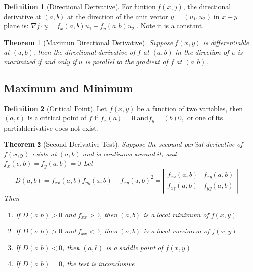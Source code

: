\documentclass[9pt]{article}
\newtheorem{theorem}{Theorem}[subsection]
\theoremstyle{definition}
\newtheorem{definition}{Definition}[section]
\theoremstyle{remark}
\begin{document}
\begin{definition}[Directional Derivative]
	For funtion $f(x,y)$, the directional derivative at $(a,b)$ at the direction of the unit vector $\underline{u} = (u_1, u_2)$ in $x-y$ plane is:
$
	\nabla f \cdot \underline{u} = f_x(a,b) u_1 + f_y(a,b) u_2
$
. Note it is a constant.
\end{definition}
\begin{theorem}[Maximun Directional Derivative]
	Suppose $f(x,y)$ is differentiable at $(a,b)$, then the directional derivative of $f$ at $(a,b)$ in the direction of $u$ is maximized if and only if $u$ is parallel to the gradient of $f$ at $(a,b)$.
\end{theorem}
\subsection{Maximum and Minimum}
\begin{definition}[Critical Point]
	Let $f(x,y)$ be a function of two variables, then $(a,b)$ is a critical point of $f$ if $f_x(a)=0$ and$ f_y=(b)0,$ or one of its partialderivative does not exist.
\end{definition}

\begin{theorem}[Second Derivative Test]
Suppose the secound partial derivative of $f(x,y)$ exists at $(a,b)$ and is continous around it, and $f_x(a,b)=f_y(a,b) = 0$
Let 
\[
D(a,b) = f_{xx}(a,b) f_{yy}(a,b) - f_{xy}(a,b)^2 = \left| \begin{matrix} f_{xx}(a,b) & f_{xy}(a,b) \\ f_{xy}(a,b) & f_{yy}(a,b) \end{matrix} \right|
\]
Then 
\begin{enumerate}
	\item If $D(a,b) > 0$ and $f_{xx} > 0$, then $(a,b)$ is a local minimum of $f(x,y)$
	\item If $D(a,b) > 0$ and $f_{xx}<0$, then $(a,b)$ is a local maximum of $f(x,y)$
	\item If $D(a,b) < 0$, then $(a,b)$ is a saddle point of $f(x,y)$
	\item If $D(a,b) = 0$, the test is inconclusive
\end{enumerate}
\end{theorem}
\end{document}
